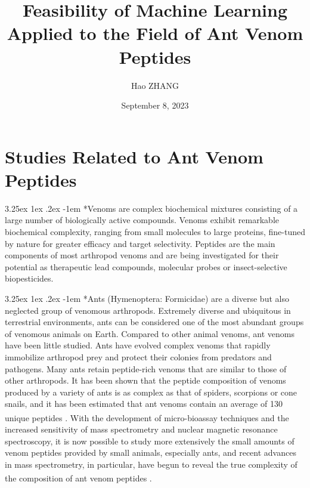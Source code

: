 \documentclass{article}
\title{Feasibility of Machine Learning Applied to the Field of Ant Venom Peptides}
\author{Hao ZHANG}
\date{September 8, 2023 }
\makeatletter
\renewcommand\paragraph{\@startsection{paragraph}{4}{\z@}%
	{3.25ex \@plus1ex \@minus.2ex}%
	{-1em}%
	{\normalfont\normalsize}}
\makeatother
\begin{document}
	
	\maketitle
	
		
		\section*{Studies Related to Ant Venom Peptides}
		
		\paragraph*{Venoms are complex biochemical mixtures consisting of a large number of biologically active compounds. Venoms exhibit remarkable biochemical complexity, ranging from small molecules to large proteins, fine-tuned by nature for greater efficacy and target selectivity. Peptides are the main components of most arthropod venoms and are being investigated for their potential as therapeutic lead compounds, molecular probes or insect-selective biopesticides.}
		
		\paragraph*{Ants (Hymenoptera: Formicidae) are a diverse but also neglected group of venomous arthropods. Extremely diverse and ubiquitous in terrestrial environments, ants can be considered one of the most abundant groups of venomous animals on Earth. Compared to other animal venoms, ant venoms have been little studied. Ants have evolved complex venoms that rapidly immobilize arthropod prey and protect their colonies from predators and pathogens. Many ants retain peptide-rich venoms that are similar to those of other arthropods. It has been shown that the peptide composition of venoms produced by a variety of ants is as complex as that of spiders, scorpions or cone snails, and it has been estimated that ant venoms contain an average of 130 unique peptides\textsuperscript{\cite{ref1}} . With the development of micro-bioassay techniques and the increased sensitivity of mass spectrometry and nuclear magnetic resonance spectroscopy, it is now possible to study more extensively the small amounts of venom peptides provided by small animals, especially ants, and recent advances in mass spectrometry, in particular, have begun to reveal the true complexity of the composition of ant venom peptides\textsuperscript{\cite{ref2}} .}
		
\end{document}
